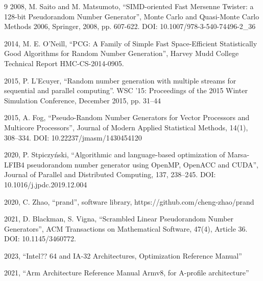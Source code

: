 \documentclass[preprint,1p,times]{elsarticle}
\begin{document}
\begin{thebibliography}{9}
 2008, M. Saito and M. Matsumoto, ``SIMD-oriented Fast Mersenne Twister: a 128-bit Pseudorandom Number Generator'', Monte Carlo and Quasi-Monte Carlo Methods 2006, Springer, 2008, pp. 607-622. DOI: 10.1007/978-3-540-74496-2\_36

 2014, M. E. O'Neill, ``PCG: A Family of Simple Fast Space-Efficient Statistically Good Algorithms for Random Number Generation'', Harvey Mudd College Technical Report HMC-CS-2014-0905.

 2015, P. L'Ecuyer,  ``Random number generation with multiple streams for sequential and parallel computing''. WSC '15: Proceedings of the 2015 Winter Simulation Conference, December 2015, pp. 31--44

 2015, A. Fog, ``Pseudo-Random Number Generators for Vector Processors and Multicore Processors'', Journal of Modern Applied Statistical Methods, 14(1), 308--334. DOI: 10.22237/jmasm/1430454120

 2020, P. Stpiczy\'nski, ``Algorithmic and language-based optimization of Marsa-LFIB4 pseudorandom number generator using OpenMP, OpenACC and CUDA'', Journal of Parallel and Distributed Computing, 137, 238--245. DOI: 10.1016/j.jpdc.2019.12.004

 2020, C. Zhao, ``prand'', software library, https://github.com/cheng-zhao/prand

 2021, D. Blackman, S. Vigna, ``Scrambled Linear Pseudorandom Number Generators'', ACM Transactions on Mathematical Software, 47(4), Article 36. DOI: 10.1145/3460772.

 2023, ``Intel?? 64 and IA-32 Architectures, Optimization Reference Manual''

 2021, ``Arm Architecture Reference Manual Armv8, for A-profile architecture''

\end{thebibliography}
\end{document}

